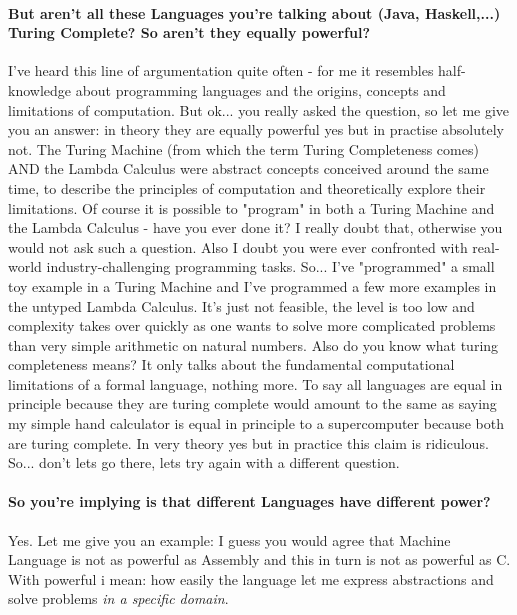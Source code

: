 \paragraph{But aren't all these Languages you're talking about (Java, Haskell,...) Turing Complete? So aren't they equally powerful?}
I've heard this line of argumentation quite often - for me it resembles half-knowledge about programming languages and the origins, concepts and limitations of computation. But ok... you really asked the question, so let me give you an answer: in theory they are equally powerful yes but in practise absolutely not.
The Turing Machine (from which the term Turing Completeness comes) AND the Lambda Calculus were abstract concepts conceived around the same time, to describe the principles of computation and theoretically explore their limitations. Of course it is possible to "program" in both a Turing Machine and the Lambda Calculus - have you ever done it? I really doubt that, otherwise you would not ask such a question. Also I doubt you were ever confronted with real-world industry-challenging programming tasks. So... I've "programmed" a small toy example in a Turing Machine and I've programmed a few more examples in the untyped Lambda Calculus. It's just not feasible, the level is too low and complexity takes over quickly as one wants to solve more complicated problems than very simple arithmetic on natural numbers.
Also do you know what turing completeness means? It only talks about the fundamental computational limitations of a formal language, nothing more. To say all languages are equal in principle because they are turing complete would amount to the same as saying my simple hand calculator is equal in principle to a supercomputer because both are turing complete. In very theory yes but in practice this claim is ridiculous. So... don't lets go there, lets try again with a different question.

\paragraph{So you're implying is that different Languages have different power?}
Yes. Let me give you an example: I guess you would agree that Machine Language is not as powerful as Assembly and this in turn is not as powerful as C.
With powerful i mean: how easily the language let me express abstractions and solve problems \textit{in a specific domain}. 